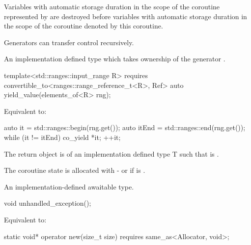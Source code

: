 \documentclass{wg21}
\begin{document}
\begin{addedblock}
\begin{itemdescr}
Variables with automatic storage duration in the scope of the coroutine represented by  are destroyed
before variables with automatic storage duration in the scope of the coroutine denoted by this coroutine.

\begin{note}
Generators can transfer control recursively.
\end{note}

\returns An implementation defined  type which takes ownership of the generator .

\end{itemdescr}


\begin{itemdecl}
template<std::ranges::input_range R>
  requires convertible_to<ranges::range_reference_t<R>, Ref>
auto yield_value(elements_of<R> rng);
\end{itemdecl}

\begin{itemdescr}
\effects
Equivalent to:
\begin{codeblock}
{
    auto it = std::ranges::begin(rng.get());
    auto itEnd = std::ranges::end(rng.get());
    while (it != itEnd) {
        co_yield *it;
        ++it;
    }
}
\end{codeblock}

The return object is of an implementation defined type T such that
 is .

\begin{note}
The coroutine state is allocated with  - or  if 
is .
\end{note}

\returns An implementation-defined awaitable type.

\end{itemdescr}

\begin{itemdecl}
void unhandled_exception();
\end{itemdecl}

\begin{itemdescr}
\effects Equivalent to: 
\end{itemdescr}

\begin{itemdecl}
static void* operator new(size_t size) requires same_as<Allocator, void>;
\end{itemdecl}


\end{addedblock}
\end{document}
